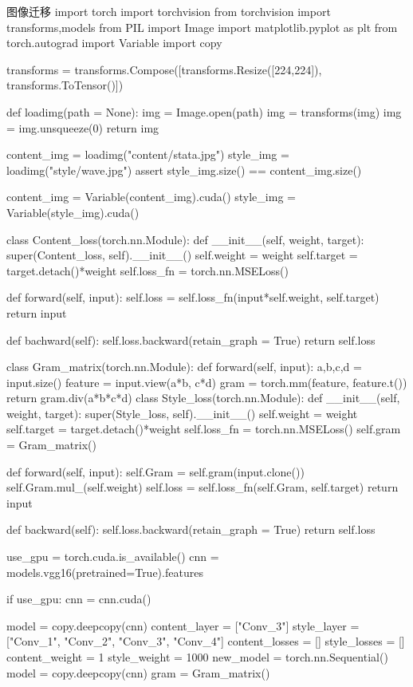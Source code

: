 \documentclass[openbib]{article}
\begin{document}
\begin{Python}{图像迁移}
	import torch
	import torchvision
	from torchvision import transforms,models
	from PIL import Image
	import matplotlib.pyplot as plt
	from torch.autograd import Variable
	import copy
	
	transforms = transforms.Compose([transforms.Resize([224,224]),
	transforms.ToTensor()])
	
	def loadimg(path = None):
	img = Image.open(path)
	img = transforms(img)
	img = img.unsqueeze(0)
	return img
	
	content_img = loadimg("content/stata.jpg")
	style_img = loadimg("style/wave.jpg")
	assert style_img.size() == content_img.size()
	
	content_img = Variable(content_img).cuda()
	style_img = Variable(style_img).cuda()
	
	class Content_loss(torch.nn.Module):
	def __init__(self, weight, target):
	super(Content_loss, self).__init__()
	self.weight = weight
	self.target = target.detach()*weight
	self.loss_fn = torch.nn.MSELoss()
	
	def forward(self, input):
	self.loss = self.loss_fn(input*self.weight, self.target)
	return input
	
	def bachward(self):
	self.loss.backward(retain_graph = True)
	return self.loss
	
	class Gram_matrix(torch.nn.Module):
	def forward(self, input):
	a,b,c,d = input.size()
	feature = input.view(a*b, c*d)
	gram = torch.mm(feature, feature.t())
	return gram.div(a*b*c*d)
	class Style_loss(torch.nn.Module):
	def __init__(self, weight, target):
	super(Style_loss, self).__init__()
	self.weight = weight
	self.target = target.detach()*weight
	self.loss_fn = torch.nn.MSELoss()
	self.gram = Gram_matrix()
	
	def forward(self, input):
	self.Gram = self.gram(input.clone())
	self.Gram.mul_(self.weight)
	self.loss = self.loss_fn(self.Gram, self.target)
	return input
	
	def backward(self):
	self.loss.backward(retain_graph = True)
	return self.loss
	
	use_gpu = torch.cuda.is_available()
	cnn = models.vgg16(pretrained=True).features
	
	if use_gpu:
	cnn = cnn.cuda()
	
	model = copy.deepcopy(cnn)
	content_layer = ["Conv_3"]
	style_layer = ["Conv_1", "Conv_2", "Conv_3", "Conv_4"]
	content_losses = []
	style_losses = []
	content_weight = 1
	style_weight = 1000
	new_model = torch.nn.Sequential()
	model = copy.deepcopy(cnn)
	gram = Gram_matrix()
	

\end{Python}
\end{document}
